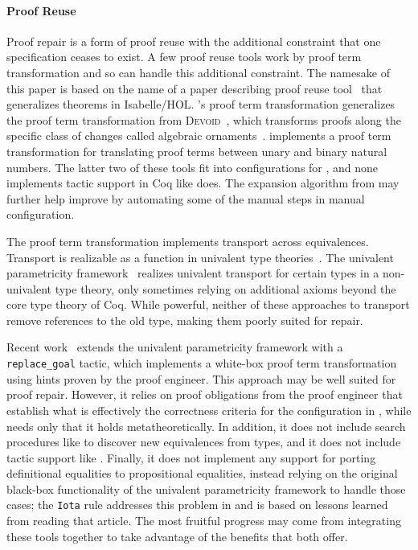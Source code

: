 \paragraph{Proof Reuse}

Proof repair is a form of proof reuse with the additional constraint that one specification ceases to exist.
A few proof reuse tools work by proof term transformation and so can handle this additional constraint.
The namesake of this paper is based on the name of a paper describing proof reuse tool~\cite{Johnsen2004}
that generalizes theorems in Isabelle/HOL.
\toolname's proof term transformation generalizes the proof term transformation from \textsc{Devoid}~\cite{Ringer2019},
which transforms proofs along the specific class of changes called algebraic ornaments~\cite{mcbride}.
\citet{magaud2000changing} implements a proof term transformation for translating proof terms between
unary and binary natural numbers. 
The latter two of these tools fit into configurations for \toolname,
and none implements tactic support in Coq like \toolname does.
The expansion algorithm from \citet{magaud2000changing} may further help improve \toolname
by automating some of the manual steps in manual configuration.

The \toolname proof term transformation implements transport across equivalences.
Transport is realizable as a function in univalent type theories~\cite{univalent2013homotopy}.
The univalent parametricity framework~\cite{tabareau2017equivalences} realizes univalent transport for certain types
in a non-univalent type theory, only sometimes relying on additional axioms beyond the core type theory of Coq.
While powerful, neither of these approaches to transport remove references to the old type, making them poorly suited for repair.

Recent work~\cite{tabareau2019marriage} extends the univalent parametricity framework with a \lstinline{replace_goal} tactic,
which implements a white-box proof term transformation using hints proven by the proof engineer.
This approach may be well suited for proof repair.
However, it relies on proof obligations from the proof engineer that establish what is effectively the correctness criteria
for the configuration in \toolname, while \toolname needs only that it holds metatheoretically.
In addition, it does not include search procedures like \toolname to discover new equivalences from types,
and it does not include tactic support like \toolname.
Finally, it does not implement any support for porting definitional equalities to propositional equalities,
instead relying on the original black-box functionality of the univalent parametricity framework to handle those cases;
the \lstinline{Iota} rule addresses this problem in \toolname and is based on lessons learned from reading that article.
The most fruitful progress may come from integrating these tools together to take advantage of the benefits that both offer.

